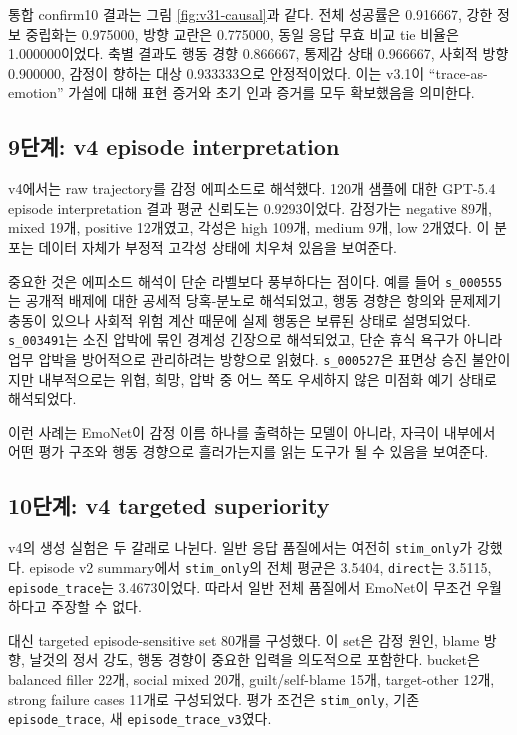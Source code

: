 \documentclass[11pt,a4paper]{article}
\newcommand{\eng}[1]{\texttt{#1}}
\begin{document}
통합 confirm10 결과는 그림 \ref{fig:v31-causal}과 같다. 전체 성공률은 0.916667, 강한 정보 중립화는 0.975000, 방향 교란은 0.775000, 동일 응답 무효 비교 tie 비율은 1.000000이었다. 축별 결과도 행동 경향 0.866667, 통제감 상태 0.966667, 사회적 방향 0.900000, 감정이 향하는 대상 0.933333으로 안정적이었다. 이는 v3.1이 ``trace-as-emotion'' 가설에 대해 표현 증거와 초기 인과 증거를 모두 확보했음을 의미한다.

\subsection{9단계: v4 episode interpretation}

v4에서는 raw trajectory를 감정 에피소드로 해석했다. 120개 샘플에 대한 GPT-5.4 episode interpretation 결과 평균 신뢰도는 0.9293이었다. 감정가는 negative 89개, mixed 19개, positive 12개였고, 각성은 high 109개, medium 9개, low 2개였다. 이 분포는 데이터 자체가 부정적 고각성 상태에 치우쳐 있음을 보여준다.

중요한 것은 에피소드 해석이 단순 라벨보다 풍부하다는 점이다. 예를 들어 \eng{s\_000555}는 공개적 배제에 대한 공세적 당혹-분노로 해석되었고, 행동 경향은 항의와 문제제기 충동이 있으나 사회적 위험 계산 때문에 실제 행동은 보류된 상태로 설명되었다. \eng{s\_003491}는 소진 압박에 묶인 경계성 긴장으로 해석되었고, 단순 휴식 욕구가 아니라 업무 압박을 방어적으로 관리하려는 방향으로 읽혔다. \eng{s\_000527}은 표면상 승진 불안이지만 내부적으로는 위협, 희망, 압박 중 어느 쪽도 우세하지 않은 미점화 예기 상태로 해석되었다.

이런 사례는 EmoNet이 감정 이름 하나를 출력하는 모델이 아니라, 자극이 내부에서 어떤 평가 구조와 행동 경향으로 흘러가는지를 읽는 도구가 될 수 있음을 보여준다.

\subsection{10단계: v4 targeted superiority}

v4의 생성 실험은 두 갈래로 나뉜다. 일반 응답 품질에서는 여전히 \eng{stim\_only}가 강했다. episode v2 summary에서 \eng{stim\_only}의 전체 평균은 3.5404, \eng{direct}는 3.5115, \eng{episode\_trace}는 3.4673이었다. 따라서 일반 전체 품질에서 EmoNet이 무조건 우월하다고 주장할 수 없다.

대신 targeted episode-sensitive set 80개를 구성했다. 이 set은 감정 원인, blame 방향, 날것의 정서 강도, 행동 경향이 중요한 입력을 의도적으로 포함한다. bucket은 balanced filler 22개, social mixed 20개, guilt/self-blame 15개, target-other 12개, strong failure cases 11개로 구성되었다. 평가 조건은 \eng{stim\_only}, 기존 \eng{episode\_trace}, 새 \eng{episode\_trace\_v3}였다.
\end{document}
